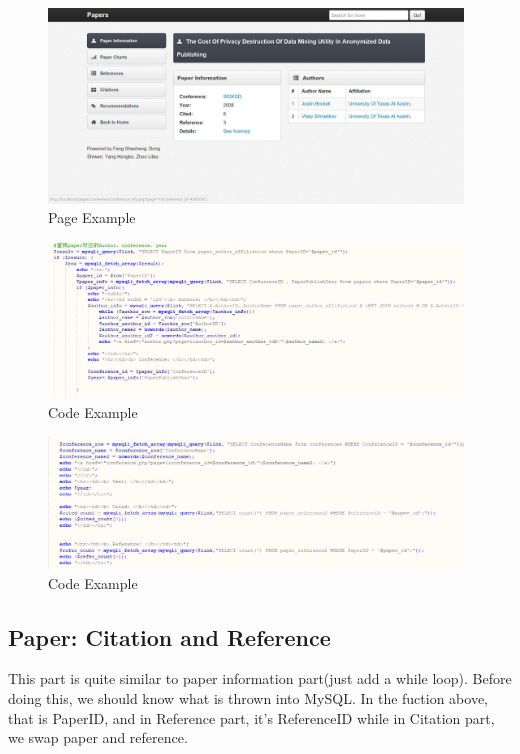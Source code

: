 \documentclass{book}
\begin{document}
\begin{figure}[H]
\centering
\includegraphics[width=11.0cm]{img/yhb_paper_1.jpg}
\caption{Page Example}
\end{figure}


\begin{figure}[H]
\centering
\includegraphics[width=11.0cm]{img/yhb_mp_1.png}
\caption{Code Example}
\end{figure}

\begin{figure}[H]
\centering
\includegraphics[width=11.0cm]{img/yhb_mp_2.png}
\caption{Code Example}
\end{figure}



\subsection{Paper: Citation and Reference}
This part is quite similar to paper information part(just add a while loop).
Before doing this, we should know what is thrown into MySQL. In the fuction above, that is PaperID, and in Reference part, it's ReferenceID while in Citation part, we swap paper and reference.
\end{document}
